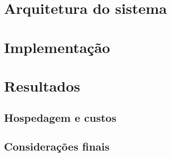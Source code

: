 \chapter{Arquitetura do sistema}\label{cap:arquitetura}


\chapter{Implementação}\label{cap:desenvolvimento}

\chapter{Resultados}\label{cap:resultados}

\section{Hospedagem e custos}\label{cap:host}

\section{Considerações finais} \label{cap:final}


